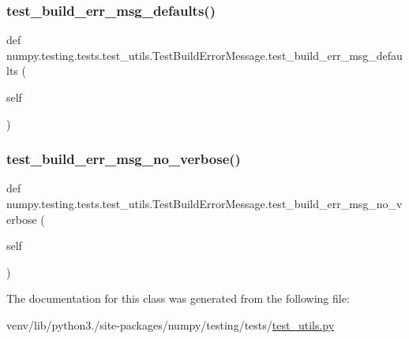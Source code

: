 \subsubsection{\texorpdfstring{test\+\_\+build\+\_\+err\+\_\+msg\+\_\+defaults()}{test\_build\_err\_msg\_defaults()}}
{\footnotesize\ttfamily def numpy.\+testing.\+tests.\+test\+\_\+utils.\+Test\+Build\+Error\+Message.\+test\+\_\+build\+\_\+err\+\_\+msg\+\_\+defaults (\begin{DoxyParamCaption}\item[{}]{self }\end{DoxyParamCaption})}

\mbox{\label{classnumpy_1_1testing_1_1tests_1_1test__utils_1_1TestBuildErrorMessage_a29400bbc273dea253edb3f0ee9fd030c}} 
\subsubsection{\texorpdfstring{test\+\_\+build\+\_\+err\+\_\+msg\+\_\+no\+\_\+verbose()}{test\_build\_err\_msg\_no\_verbose()}}
{\footnotesize\ttfamily def numpy.\+testing.\+tests.\+test\+\_\+utils.\+Test\+Build\+Error\+Message.\+test\+\_\+build\+\_\+err\+\_\+msg\+\_\+no\+\_\+verbose (\begin{DoxyParamCaption}\item[{}]{self }\end{DoxyParamCaption})}



The documentation for this class was generated from the following file\+:\begin{DoxyCompactItemize}
\item 
venv/lib/python3./site-\/packages/numpy/testing/tests/\hyperlink{numpy_2testing_2tests_2test__utils_8py}{test\+\_\+utils.\+py}\end{DoxyCompactItemize}
